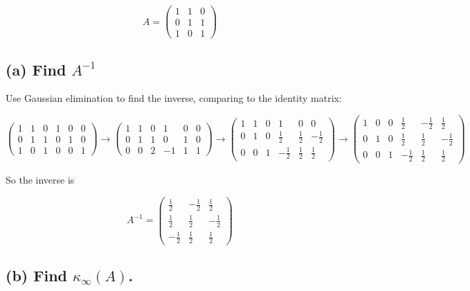 \documentclass{article}
\begin{document}
\[
A =
\begin{pmatrix}
  1 & 1 & 0 \\ 0 & 1 & 1 \\ 1 & 0 & 1
\end{pmatrix}
\]

\subsection*{(a) \normalsize Find $A^{-1}$}

Use Gaussian elimination to find the inverse, comparing to the identity matrix:

\[
\begin{pmatrix}
  1 & 1 & 0 & 1 & 0 & 0 \\ 0 & 1 & 1 & 0 & 1 & 0 \\ 1 & 0 & 1 & 0 & 0 & 1
\end{pmatrix}
\rightarrow
\begin{pmatrix}
  1 & 1 & 0 & 1 & 0 & 0 \\ 0 & 1 & 1 & 0 & 1 & 0 \\ 0 & 0 & 2 & -1 & 1 & 1
\end{pmatrix}
\rightarrow
\begin{pmatrix}
  1 & 1 & 0 & 1 & 0 & 0 \\ 0 & 1 & 0 & \frac{1}{2} & \frac{1}{2} & -\frac{1}{2} \\ 0 & 0 & 1 & -\frac{1}{2} & \frac{1}{2} & \frac{1}{2}
\end{pmatrix}
\rightarrow
\begin{pmatrix}
  1 & 0 & 0 & \frac{1}{2} & -\frac{1}{2} & \frac{1}{2} \\ 0 & 1 & 0 & \frac{1}{2} & \frac{1}{2} & -\frac{1}{2} \\ 0 & 0 & 1 & -\frac{1}{2} & \frac{1}{2} & \frac{1}{2}
\end{pmatrix}
\]

So the inverse is

\[
  A^{-1} =
  \begin{pmatrix}
    \frac{1}{2} & -\frac{1}{2} & \frac{1}{2} \\ 
    \frac{1}{2} & \frac{1}{2} & -\frac{1}{2} \\
    -\frac{1}{2} & \frac{1}{2} & \frac{1}{2}
  \end{pmatrix}
\]


\subsection*{(b) \normalsize Find $\kappa_{\infty}(A)$.}
\end{document}
